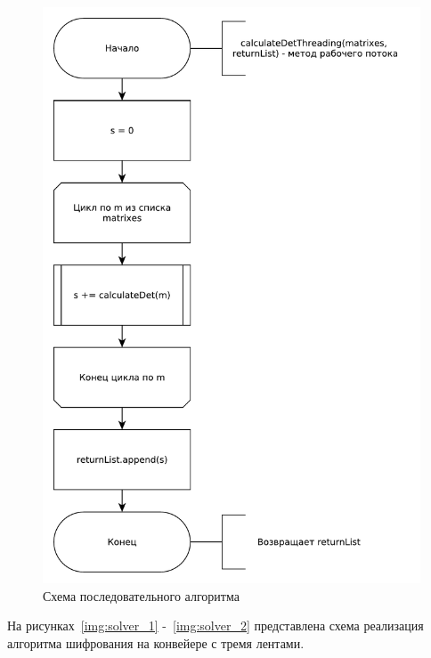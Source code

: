 \documentclass[a4paper,oneside,14pt]{extreport}
\begin{document}
\begin{figure}[H]
	\centering
	\includegraphics[width=0.85\linewidth]{images/thread_schema}
	\caption{Схема последовательного алгоритма}
	\label{img:thread_schema}
\end{figure}

На рисунках~\ref{img:solver_1} -~\ref{img:solver_2} представлена схема реализация алгоритма шифрования на конвейере с тремя лентами.
\end{document}
